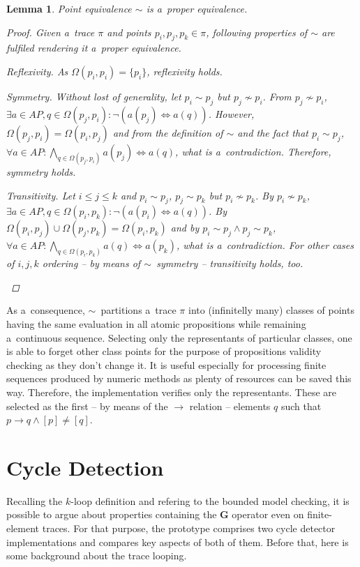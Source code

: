 \documentclass[12pt,oneside,draft]{fithesis}
\newcommand{\bG}{\mathbf{G}}
\newtheorem{mylemma}{Lemma}
\begin{document}
\begin{mylemma}
Point equivalence $\sim$ is a~proper equivalence.
\begin{proof}Given a~trace $\pi$ and points $p_i,p_j,p_k\in\pi$,
following properties of $\sim$ are fulfiled rendering it a~proper
equivalence.
	\begin{inparaenum}
		\item{Reflexivity.} As $\Omega(p_i,p_i)=\{p_i\}$,
			reflexivity holds.
		\item{Symmetry.} Without lost of generality, let $p_i\sim p_j$
			but $p_j\not\sim p_i$. From $p_j\not\sim p_i$,
			$\exists a\in AP,q\in\Omega(p_j, p_i):\neg(a(p_j)
			\iff a(q))$. However, $\Omega(p_j, p_i)=\Omega(p_i,p_j)$
			and from the definition of $\sim$ and the fact that
			$p_i\sim p_j$,
			$\forall a\in AP:\bigwedge_{q\in\Omega(p_j,p_i)}a(p_j)\iff
			a(q)$, what is a~contradiction. Therefore, symmetry holds.
		\item{Transitivity.} Let $i\leq j\leq k$ and $p_i\sim p_j$,
			$p_j\sim p_k$ but $p_i\not\sim p_k$. By $p_i\not\sim p_k$,
			$\exists a\in AP, q\in\Omega(p_i, p_k):
			\neg(a(p_i)\iff a(q))$. By
			$\Omega(p_i,p_j)\cup\Omega(p_j,p_k)=\Omega(p_i,p_k)$ and by
			$p_i\sim p_j\wedge p_j\sim p_k$,
			$\forall a\in AP:\bigwedge_{q\in\Omega(p_i,p_k)}a(q)
			\iff a(p_k)$, what is a~contradiction. For other cases of
			$i,j,k$ ordering -- by means of $\sim$~symmetry --
			transitivity holds, too.
	\end{inparaenum}
	\qedhere
\end{proof}
\end{mylemma}
As a~consequence, $\sim$~partitions a~trace $\pi$ into
(infinitelly many) classes of points having the same evaluation in all
atomic propositions while remaining a~continuous sequence. Selecting
only the representants of particular classes, one is able to forget
other class points for the purpose of propositions validity checking
as they don't change it. It is useful especially for processing
finite sequences produced by numeric methods as plenty of resources can
be saved this way. Therefore, the implementation verifies only the
representants. These are selected as the first -- by means of
the $\rightarrow$ relation -- elements $q$ such that
$p\rightarrow q\wedge[p]\neq[q]$.

\section{Cycle Detection}
Recalling the $k$-loop definition and refering to the bounded model
checking, it is possible to argue about properties containing the $\bG$
operator even on finite-element traces\cite{biere}. For that purpose,
the prototype comprises two cycle detector implementations and compares
key aspects of both of them. Before that, here is some background about
the trace looping.
\end{document}
